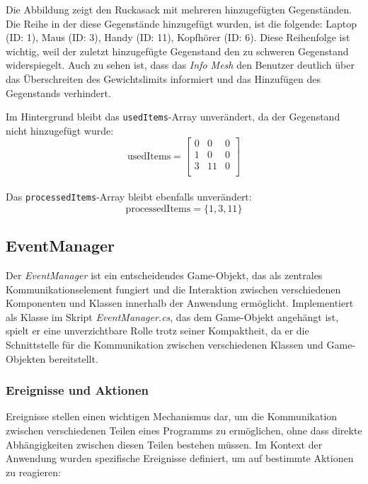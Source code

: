 \begin{itemize}
Die Abbildung zeigt den Ruckasack mit mehreren hinzugefügten Gegenständen. Die Reihe in der diese Gegenstände
hinzugefügt wurden, ist die folgende: Laptop (ID: 1), Maus (ID: 3), Handy (ID: 11), Kopfhörer (ID: 6). Diese Reihenfolge
ist wichtig, weil der zuletzt hinzugefügte Gegenstand den zu schweren Gegenstand widerspiegelt. Auch zu sehen ist, dass
das \textit{Info Mesh} den Benutzer deutlich über das Überschreiten des Gewichtslimits informiert und das Hinzufügen
des Gegenstands verhindert.

Im Hintergrund bleibt das \texttt{usedItems}-Array unverändert, da der Gegenstand nicht hinzugefügt wurde:
\[
\text{usedItems} =
\left[
\begin{array}{ccccc}
0 & 0 & 0 \\
1 & 0 & 0 \\
3 & 11 & 0 \\
\end{array}
\right]
\]
\\
Das \texttt{processedItems}-Array bleibt ebenfalls unverändert:
\[
\text{processedItems} = \{1, 3, 11\}
\]



\subsection{EventManager}

Der \textit{EventManager} ist ein entscheidendes Game-Objekt, das als zentrales Kommunikationselement fungiert und die
Interaktion zwischen verschiedenen Komponenten und Klassen innerhalb der Anwendung ermöglicht. Implementiert als Klasse
im Skript \textit{EventManager.cs}, das dem Game-Objekt angehängt ist, spielt er eine unverzichtbare Rolle trotz seiner
Kompaktheit, da er die Schnittstelle für die Kommunikation zwischen verschiedenen Klassen und Game-Objekten bereitstellt.


\subsubsection*{Ereignisse und Aktionen}

Ereignisse stellen einen wichtigen Mechanismus dar, um die Kommunikation zwischen verschiedenen Teilen eines Programms zu
ermöglichen, ohne dass direkte Abhängigkeiten zwischen diesen Teilen bestehen müssen. Im Kontext der Anwendung wurden
spezifische Ereignisse definiert, um auf bestimmte Aktionen zu reagieren:


\end{itemize}
